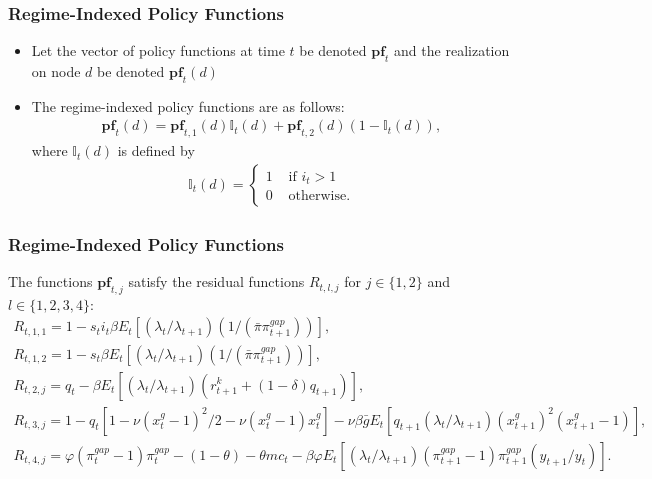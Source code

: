\documentclass[11pt]{beamer}
\begin{document}

\begin{frame}\frametitle{Regime-Indexed Policy Functions}
\begin{itemize}\setlength{\itemsep}{10pt}
\item Let the vector of policy functions at time $t$ be denoted $\textbf{pf}_t$ and the realization on node $d$ be denoted $\textbf{pf}_t(d)$
\item The regime-indexed policy functions are as follows: 
\begin{gather*}
  \textbf{pf}_t(d) = \textbf{pf}_{t,1}(d)\mathds{I}_t(d) + \textbf{pf}_{t,2}(d)(1-\mathds{I}_t(d)),
\end{gather*}
where $\mathds{I}_t(d)$ is defined by 
\begin{gather*}
  \mathds{I}_t(d) = 
\begin{cases}
     1 &\text{ if } i_t > 1\\
     0 &\text{ otherwise.}
\end{cases}
\end{gather*}
\end{itemize}
\end{frame}
\begin{frame}\frametitle{Regime-Indexed Policy Functions}
The functions $\textbf{pf}_{t,j}$ satisfy the residual functions $R_{t,l,j}$ for $j \in\{1,2\}$ and $l \in \{1,2,3,4\}$: %
\scriptsize
\begin{gather*}
  R_{t,1,1} = 1 - s_ti_t\beta E_t[(\lambda_t/\lambda_{t+1})(1/(\bar{\pi}\pi_{t+1}^{gap}))],\\
  R_{t,1,2} = 1 - s_t\beta E_t[(\lambda_t/\lambda_{t+1})(1/(\bar{\pi}\pi_{t+1}^{gap}))],\\
R_{t,2,j} = q_t - \beta E_t[(\lambda_t/\lambda_{t+1})(r^k_{t+1}+(1-\delta)q_{t+1})],\\
    R_{t,3,j} = 1 - q_t[1-\nu(x^g_t-1)^2/2 - \nu(x_t^g-1)x_t^g] - \nu\beta\bar{g}E_t[q_{t+1}(\lambda_t/\lambda_{t+1})(x^g_{t+1})^2(x^g_{t+1}-1)], \\
    R_{t,4,j} = \varphi(\pi_t^{gap}-1)\pi_t^{gap} - (1-\theta) - \theta mc_t - \beta\varphi E_t[(\lambda_t/\lambda_{t+1})(\pi_{t+1}^{gap}-1)\pi_{t+1}^{gap}(y_{t+1}/y_t)].
  \end{gather*}
\normalfont
\end{frame}
\end{document}
